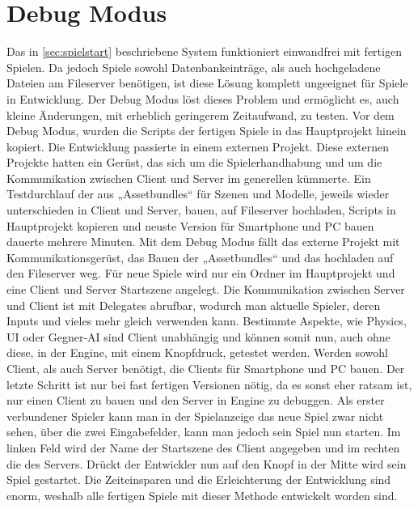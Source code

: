 \section{Debug Modus} \label{sec:debug-modus}
Das in \ref{sec:spielstart} beschriebene System funktioniert einwandfrei mit fertigen Spielen. Da jedoch Spiele sowohl Datenbankeinträge, als auch hochgeladene Dateien am Fileserver benötigen, ist diese Lösung komplett ungeeignet für Spiele in Entwicklung. Der Debug Modus löst dieses Problem und ermöglicht es, auch kleine Änderungen, mit erheblich geringerem Zeitaufwand, zu testen.
Vor dem Debug Modus, wurden die Scripts der fertigen Spiele in das Hauptprojekt hinein kopiert. Die Entwicklung passierte in einem externen Projekt. Diese externen Projekte hatten ein Gerüst, das sich um die Spielerhandhabung und um die Kommunikation zwischen Client und Server im generellen kümmerte. Ein Testdurchlauf der aus „Assetbundles“ für Szenen und Modelle, jeweils wieder unterschieden in Client und Server, bauen, auf Fileserver hochladen, Scripts in Hauptprojekt kopieren und neuste Version für Smartphone und PC bauen dauerte mehrere Minuten.
Mit dem Debug Modus fällt das externe Projekt mit Kommunikationsgerüst, das Bauen der „Assetbundles“ und das hochladen auf den Fileserver weg. Für neue Spiele wird nur ein Ordner im Hauptprojekt und eine Client und Server Startszene angelegt. Die Kommunikation zwischen Server und Client ist mit Delegates abrufbar, wodurch man aktuelle Spieler, deren Inputs und vieles mehr gleich verwenden kann. Bestimmte Aspekte, wie Physics, UI oder Gegner-AI sind Client unabhängig und können somit nun, auch ohne diese, in der Engine, mit einem Knopfdruck, getestet werden. Werden sowohl Client, als auch Server benötigt, die Clients für Smartphone und PC bauen. Der letzte Schritt ist nur bei fast fertigen Versionen nötig, da es sonst eher ratsam ist, nur einen Client zu bauen und den Server in Engine zu debuggen.
Als erster verbundener Spieler kann man in der Spielanzeige das neue Spiel zwar nicht sehen, über die zwei Eingabefelder, kann man jedoch sein Spiel nun starten. Im linken Feld wird der Name der Startszene des Client angegeben und im rechten die des Servers. Drückt der Entwickler nun auf den Knopf in der Mitte wird sein Spiel gestartet. Die Zeiteinsparen und die Erleichterung der Entwicklung sind enorm, weshalb alle fertigen Spiele mit dieser Methode entwickelt worden sind.
